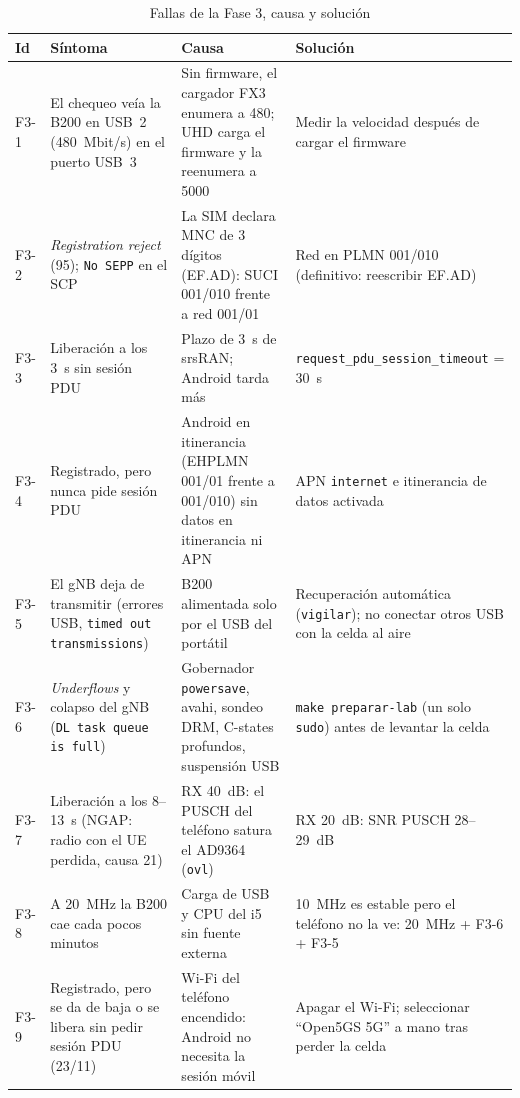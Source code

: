 \documentclass[conference]{IEEEtran}
\begin{document}
\begin{table}[!t]
\caption{Fallas de la Fase 3, causa y solución}
\label{tab:fallas}
\centering
\footnotesize
\renewcommand{\arraystretch}{1.1}
\begin{tabular}{p{0.6cm}p{4.6cm}p{5.6cm}p{5.6cm}}
\toprule
\textbf{Id} & \textbf{Síntoma} & \textbf{Causa} & \textbf{Solución} \\
\midrule
F3-1 & El chequeo veía la B200 en USB~2 (480~Mbit/s) en el puerto USB~3 & Sin firmware, el cargador FX3 enumera a 480; UHD carga el firmware y la reenumera a 5000 & Medir la velocidad después de cargar el firmware \\
F3-2 & \textit{Registration reject} (95); \texttt{No SEPP} en el SCP & La SIM declara MNC de 3 dígitos (EF.AD): SUCI 001/010 frente a red 001/01 & Red en PLMN 001/010 (definitivo: reescribir EF.AD) \\
F3-3 & Liberación a los 3~s sin sesión PDU & Plazo de 3~s de srsRAN; Android tarda más & \texttt{request\_pdu\_session\_timeout} = 30~s \\
F3-4 & Registrado, pero nunca pide sesión PDU & Android en itinerancia (EHPLMN 001/01 frente a 001/010) sin datos en itinerancia ni APN & APN \texttt{internet} e itinerancia de datos activada \\
F3-5 & El gNB deja de transmitir (errores USB, \texttt{timed out transmissions}) & B200 alimentada solo por el USB del portátil & Recuperación automática (\texttt{vigilar}); no conectar otros USB con la celda al aire \\
F3-6 & \textit{Underflows} y colapso del gNB (\texttt{DL task queue is full}) & Gobernador \texttt{powersave}, avahi, sondeo DRM, C-states profundos, suspensión USB & \texttt{make preparar-lab} (un solo \texttt{sudo}) antes de levantar la celda \\
F3-7 & Liberación a los 8--13~s (NGAP: radio con el UE perdida, causa 21) & RX 40~dB: el PUSCH del teléfono satura el AD9364 (\texttt{ovl}) & RX 20~dB: SNR PUSCH 28--29~dB \\
F3-8 & A 20~MHz la B200 cae cada pocos minutos & Carga de USB y CPU del i5 sin fuente externa & 10~MHz es estable pero el teléfono no la ve: 20~MHz + F3-6 + F3-5 \\
F3-9 & Registrado, pero se da de baja o se libera sin pedir sesión PDU (23/11) & Wi-Fi del teléfono encendido: Android no necesita la sesión móvil & Apagar el Wi-Fi; seleccionar ``Open5GS 5G'' a mano tras perder la celda \\
\bottomrule
\end{tabular}
\end{table}
\end{document}

